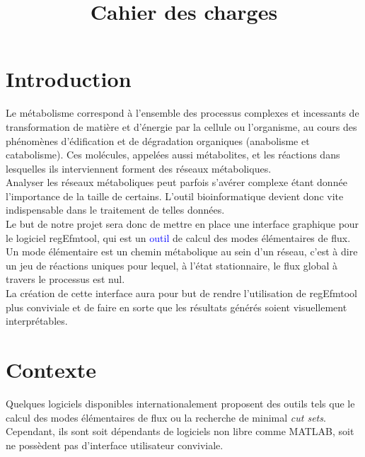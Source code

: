 \documentclass[12pt,a4paper]{report}
\title{Cahier des charges}
\begin{document}


\tableofcontents

\thispagestyle{empty}

\chapter*{Introduction}

\noindent Le métabolisme correspond à l'ensemble des processus complexes et incessants de transformation de matière et d'énergie par la cellule ou l'organisme, au cours des phénomènes d'édification et de dégradation organiques (anabolisme et catabolisme). 
Ces molécules, appelées aussi métabolites, et les réactions dans lesquelles ils interviennent forment des réseaux métaboliques. \\

\noindent Analyser les réseaux métaboliques peut parfois s'avérer complexe étant donnée l'importance de la taille de certains. L'outil bioinformatique devient donc vite indispensable dans le traitement de telles données.\\ 
Le but de notre projet sera donc de mettre en place une interface graphique pour le logiciel regEfmtool, qui est un \textcolor{blue}{outil} de calcul des modes élémentaires de flux.
Un mode élémentaire est un chemin métabolique au sein d'un réseau, c'est à dire un jeu de réactions uniques pour lequel, à l'état stationnaire, le flux global à travers le processus est nul.\\
La création de cette interface aura pour but de rendre l'utilisation de regEfmtool plus conviviale et de faire en sorte que les résultats générés soient visuellement interprétables. 

\chapter{Contexte}

\noindent Quelques logiciels disponibles internationalement proposent des outils tels que le calcul des modes élémentaires de flux ou la recherche de minimal \textit{cut sets}. Cependant, ils sont soit dépendants de logiciels non libre comme MATLAB, soit ne possèdent pas d'interface utilisateur conviviale.\\
\end{document}
